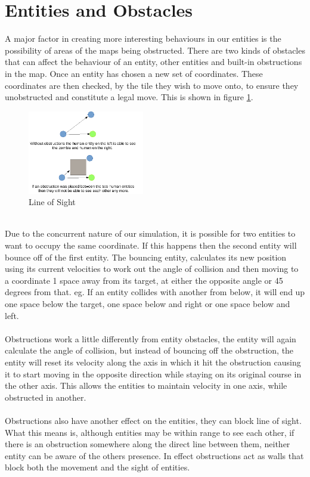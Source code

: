 \documentclass[10pt, a4paper, conference, compsocconf]{IEEEtran}
\begin{document}
\section{Entities and Obstacles \label{obstacles_b}}
A major factor in creating more interesting behaviours in our entities is the possibility of areas of the maps being obstructed. There are two kinds of obstacles that can affect the behaviour of an entity, other entities and built-in obstructions in the map. Once an entity has chosen a new set of coordinates. These coordinates are then checked, by the tile they wish to move onto, to ensure they unobstructed and constitute a legal move. This is shown in figure \ref{fig:obs_los}.\\
\begin{figure}[h]
  \centering
  \includegraphics[width=2in]{../img/los_demo.png}
\caption{Line of Sight}
    \label{fig:obs_los}
\end{figure}
\\
Due to the concurrent nature of our simulation, it is possible for two entities to want to occupy the same coordinate. If this happens then the second entity will bounce off of the first entity. The bouncing entity, calculates its new position using its current velocities to work out the angle of collision and then moving to a coordinate 1 space away from its target, at either the opposite angle or 45 degrees from that. eg. If an entity collides with another from below, it will end up one space below the target, one space below and right or one space below and left.\\
\\
Obstructions work a little differently from entity obstacles, the entity will again calculate the angle of collision, but instead of bouncing off the obstruction, the entity will reset its velocity along the axis in which it hit the obstruction causing it to start moving in the opposite direction while staying on its original course in the other axis. This allows the entities to maintain velocity in one axis, while obstructed in another.\\
\\
Obstructions also have another effect on the entities, they can block line of sight. What this means is, although entities may be within range to see each other, if there is an obstruction somewhere along the direct line between them, neither entity can be aware of the others presence. In effect obstructions act as walls that block both the movement and the sight of entities.\\
\end{document}
